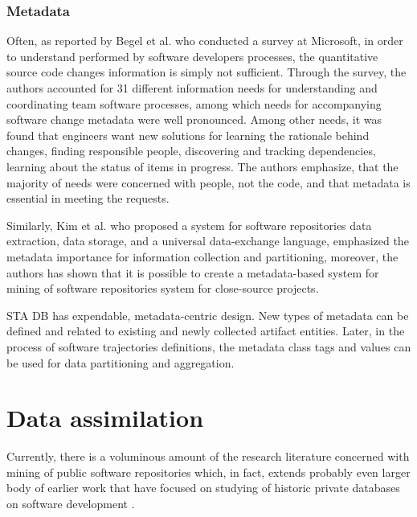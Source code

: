 \subsubsection{Metadata}
Often, as reported by Begel
et al. \cite{citeulike:7260421} who conducted a survey at Microsoft, in order to understand performed 
by software developers processes, the quantitative source code changes information is simply not sufficient. Through the survey,
the authors accounted for 31 different information needs for understanding and coordinating team software processes, among 
which needs for accompanying software change metadata were well pronounced. Among other needs, it was found that engineers want new 
solutions for
learning the rationale behind
changes, finding responsible people, discovering and tracking dependencies, 
learning
about the status of items in progress. The authors emphasize, that the majority of needs were concerned with people, not 
the code, and that metadata is essential in meeting the requests.

Similarly, Kim et al. \cite{citeulike:4000311} who proposed a system for software repositories data extraction, data storage, 
and a universal data-exchange language, emphasized the metadata importance for information collection and partitioning, moreover, 
the authors has shown that it is possible to create a metadata-based system for mining of software repositories system for 
close-source projects.

STA DB has expendable, metadata-centric design. New types of metadata can be defined and related to existing and newly collected
artifact entities. Later, in the process of software trajectories definitions, the metadata class tags and values can be used 
for data partitioning and aggregation.

\section{Data assimilation}
Currently, there is a voluminous amount of the research literature concerned with mining of public software repositories 
\cite{citeulike:2710928} which, in fact, extends probably even larger body of earlier work that have focused on studying 
of historic private databases on software development \cite{citeulike:393158} \cite{citeulike:13125375} \cite{citeulike:13125481}.

